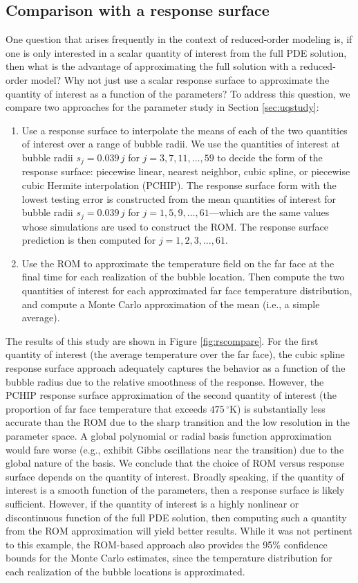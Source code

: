 \documentclass[final]{siamltex}
\begin{document}
\subsection{Comparison with a response surface}
\label{sec:compare}
One question that arises frequently in the context of reduced-order
modeling is, if one is only interested in a scalar quantity of
interest from the full PDE solution, then what is the advantage of
approximating the full solution with a reduced-order model? Why not
just use a scalar response surface to approximate the quantity of
interest as a function of the parameters?  To address this question,
we compare two approaches for the parameter study in Section
\ref{sec:uqstudy}:
\begin{enumerate}
\item Use a response surface to interpolate the means of each of the
  two quantities of interest over a range of bubble radii.  We use the
  quantities of interest at bubble radii $s_j=0.039\,j$ for
  $j=3,7,11,\dots,59$ to decide the form of the response surface:
  piecewise linear, nearest neighbor, cubic spline, or piecewise cubic
  Hermite interpolation (PCHIP).  The response surface form with the
  lowest testing error is constructed from the mean quantities of
  interest for bubble radii $s_j=0.039\,j$ for
  $j=1,5,9,\dots,61$---which are the same values whose simulations are
  used to construct the ROM.  The response surface prediction is then
  computed for $j=1,2,3,\dots,61$.
\item Use the ROM to approximate the temperature field on the far face
  at the final time for each realization of the bubble location. Then
  compute the two quantities of interest for each approximated far
  face temperature distribution, and compute a Monte Carlo
  approximation of the mean (i.e., a simple average).
\end{enumerate}
The results of this study are shown in Figure \ref{fig:rscompare}. For
the first quantity of interest (the average temperature over the far
face), the cubic spline response surface approach adequately captures
the behavior as a function of the bubble radius due to the relative
smoothness of the response. However, the PCHIP response surface
approximation of the second quantity of interest (the proportion of
far face temperature that exceeds $475\,^{\circ}\mathrm{K}$) is
substantially less accurate than the ROM due to the sharp transition
and the low resolution in the parameter space. A global polynomial or
radial basis function approximation would fare worse (e.g., exhibit
Gibbs oscillations near the transition) due to the global nature of
the basis.  We conclude that the choice of ROM versus response surface
depends on the quantity of interest. Broadly speaking, if the quantity
of interest is a smooth function of the parameters, then a response
surface is likely sufficient. However, if the quantity of interest is
a highly nonlinear or discontinuous function of the full PDE solution,
then computing such a quantity from the ROM approximation will yield
better results. While it was not pertinent to this example, the
ROM-based approach also provides the 95\% confidence bounds for the
Monte Carlo estimates, since the temperature distribution for each
realization of the bubble locations is approximated.
\end{document}
